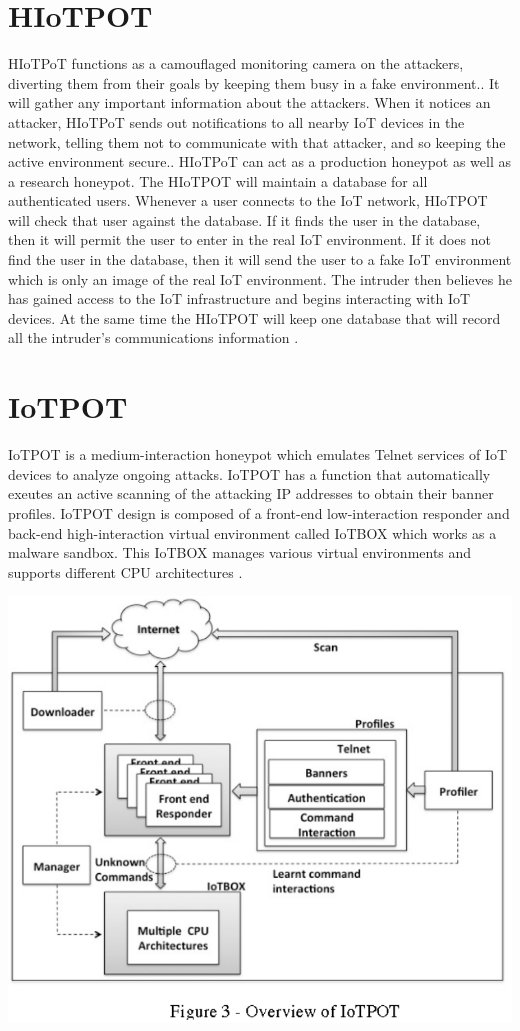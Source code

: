 \documentclass[epsfig,a4paper,11pt,titlepage,oneside,openany]{book}
\begin{document}
\begin{itemize}
\section{HIoTPOT}

HIoTPoT functions as a camouflaged monitoring camera on the attackers, diverting them from their goals by keeping them busy in a fake environment.. It will gather any important information about the attackers. When it notices an attacker, HIoTPoT sends out notifications to all nearby IoT devices in the network, telling them not to communicate with that attacker, and so keeping the active environment secure.. HIoTPoT can act as a production honeypot as well as a research honeypot. The HIoTPOT will maintain a database for all authenticated users. Whenever a user connects to the IoT network, HIoTPOT will check that user against the database. If it finds the user in the database, then it will permit the user to enter in the real IoT environment. If it does not find the user in the database, then it will send the user to a fake IoT environment which is only an image of the real IoT environment. The intruder then believes he has gained access to the IoT infrastructure and begins interacting with IoT devices. At the same time the HIoTPOT will keep one database that will record all the intruder's communications information \cite{gandhi}.

\section{IoTPOT}

IoTPOT is a medium-interaction honeypot which emulates Telnet services of IoT devices to analyze ongoing attacks. IoTPOT has a function that automatically exeutes an active scanning of the attacking IP addresses to obtain their banner profiles. IoTPOT design is composed of a front-end low-interaction responder and back-end high-interaction virtual environment called IoTBOX which works as a malware sandbox. This IoTBOX manages various virtual environments and supports different CPU architectures \cite{IoTPOT}.
\begin{center}
\includegraphics[scale=0.35]{iotpot}
\end{center}


\end{itemize}
\end{document}
